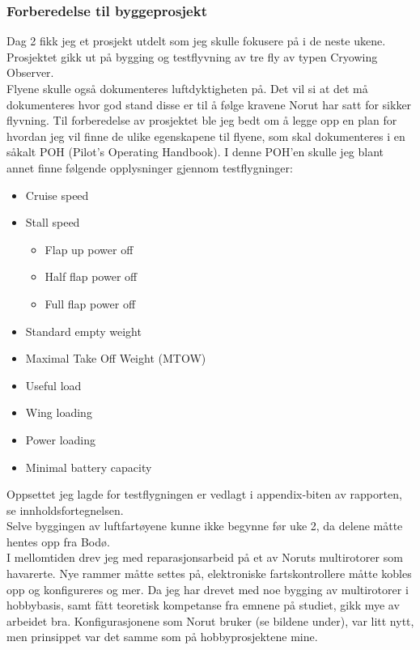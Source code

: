 \documentclass[12pt, a4paper]{report}
\begin{document}
\subsubsection{Forberedelse til byggeprosjekt}
Dag 2 fikk jeg et prosjekt utdelt som jeg skulle fokusere på i de neste ukene. Prosjektet gikk ut på bygging og testflyvning av tre fly av typen Cryowing Observer. \\
Flyene skulle også dokumenteres luftdyktigheten på. Det vil si at det må dokumenteres hvor god stand disse er til å følge kravene Norut har satt for sikker flyvning. Til forberedelse av prosjektet ble jeg bedt om å legge opp en plan for hvordan jeg vil finne de ulike egenskapene til flyene, som skal dokumenteres i en såkalt POH (Pilot's Operating Handbook). I denne POH'en skulle jeg blant annet finne følgende opplysninger gjennom testflygninger: 
\begin{itemize}
	\item Cruise speed
	\item Stall speed
	\begin{itemize}
		\item Flap up power off
		\item Half flap power off
		\item Full flap power off	
	\end{itemize}
	\item Standard empty weight
	\item Maximal Take Off Weight (MTOW)
	\item Useful load
	\item Wing loading
	\item Power loading
	\item Minimal battery capacity
\end{itemize}
Oppsettet jeg lagde for testflygningen er vedlagt i appendix-biten av rapporten, se innholdsfortegnelsen. \\
Selve byggingen av luftfartøyene kunne ikke begynne før uke 2, da delene måtte hentes opp fra Bodø. \\ 
\newpage
I mellomtiden drev jeg med reparasjonsarbeid på et av Noruts multirotorer som havarerte. Nye rammer måtte settes på, elektroniske fartskontrollere måtte kobles opp og konfigureres og mer. Da jeg har drevet med noe bygging av multirotorer i hobbybasis, samt fått teoretisk kompetanse fra emnene på studiet, gikk mye av arbeidet bra. Konfigurasjonene som Norut bruker (se bildene under), var litt nytt, men prinsippet var det samme som på hobbyprosjektene mine. \\
\end{document}
